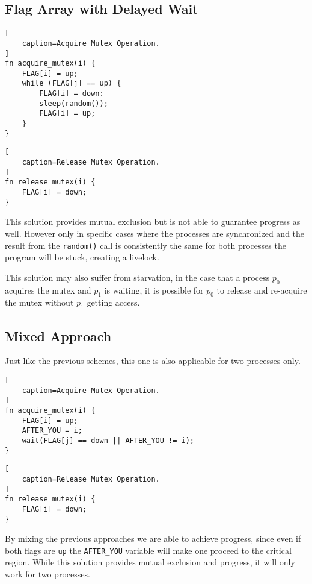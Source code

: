 \subsection{Flag Array with Delayed Wait}

\begin{lstlisting}[
    caption=Acquire Mutex Operation.
]
fn acquire_mutex(i) {
    FLAG[i] = up;
    while (FLAG[j] == up) {
        FLAG[i] = down:
        sleep(random());
        FLAG[i] = up;
    }
}
\end{lstlisting}

\begin{lstlisting}[
    caption=Release Mutex Operation.
]
fn release_mutex(i) {
    FLAG[i] = down;
}
\end{lstlisting}

This solution provides mutual exclusion but is not able to guarantee progress as well.
However only in specific cases where the processes are synchronized and the result from the \texttt{random()} call is consistently the same for both processes the program will be stuck,
creating a livelock.

This solution may also suffer from starvation,
in the case that a process $p_0$ acquires the mutex and $p_1$ is waiting,
it is possible for $p_0$ to release and re-acquire the mutex without $p_1$ getting access.

\subsection{Mixed Approach}\label{sec:mixed}

Just like the previous schemes,
this one is also applicable for two processes only.


\begin{lstlisting}[
    caption=Acquire Mutex Operation.
]
fn acquire_mutex(i) {
    FLAG[i] = up;
    AFTER_YOU = i;
    wait(FLAG[j] == down || AFTER_YOU != i);
}
\end{lstlisting}

\begin{lstlisting}[
    caption=Release Mutex Operation.
]
fn release_mutex(i) {
    FLAG[i] = down;
}
\end{lstlisting}

By mixing the previous approaches we are able to achieve progress,
since even if both flags are \texttt{up} the \texttt{AFTER\_YOU} variable will make one proceed to the critical region.
While this solution provides mutual exclusion and progress,
it will only work for two processes.

